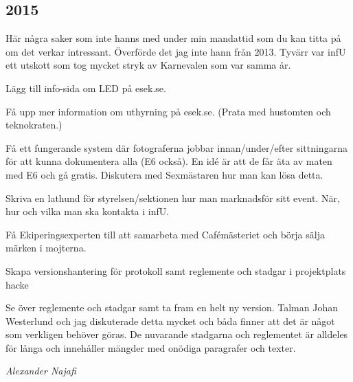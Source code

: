 \documentclass[10pt]{article}
\begin{document}
\subsection{2015}
Här några saker som inte hanns med under min mandattid som du kan titta på om det verkar intressant. Överförde det jag inte hann från 2013. Tyvärr var infU ett utskott som tog mycket stryk av Karnevalen som var samma år.
\begin{tightdashlist}
    \item Lägg till info-sida om LED på esek.se.
    \item Få upp mer information om uthyrning på esek.se. (Prata med hustomten och teknokraten.)
    \item Få ett fungerande system där fotograferna jobbar innan/under/efter sittningarna för att kunna dokumentera alla (E6 också). En idé är att de får äta av maten med E6 och gå gratis. Diskutera med Sexmästaren hur man kan lösa detta.
    \item Skriva en lathund för styrelsen/sektionen hur man marknadsför sitt event. När, hur och vilka man ska kontakta i infU.
    \item Få Ekiperingsexperten till att samarbeta med Cafémästeriet och börja sälja märken i mojterna.
    \item Skapa versionshantering för protokoll samt reglemente och stadgar i projektplats hacke
    \item Se över reglemente och stadgar samt ta fram en helt ny version. Talman Johan Westerlund och jag diskuterade detta mycket och båda finner att det är något som verkligen behöver göras. De nuvarande stadgarna och reglementet är alldeles för långa och innehåller mängder med onödiga paragrafer och texter.
\end{tightdashlist}

\emph{Alexander Najafi}
\end{document}
